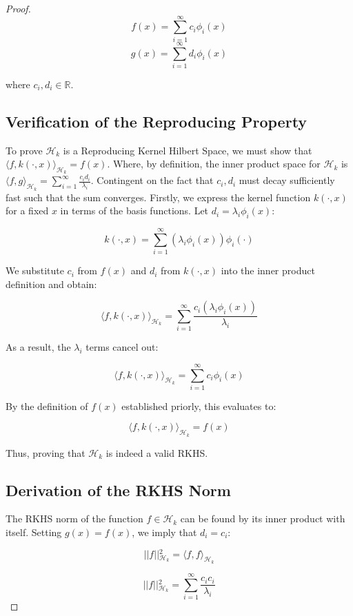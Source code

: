 \documentclass[12pt,oneside]{report}
\theoremstyle{definition}
\theoremstyle{remark}
\begin{document}
\begin{proof}
$$f(x) = \sum_{i=1}^{\infty} c_i \phi_i(x)$$
$$g(x) = \sum_{i=1}^{\infty} d_i \phi_i(x)$$


where $c_i, d_i \in \mathbb{R}$.

\subsection{Verification of the Reproducing Property}
To prove $\mathcal{H}_k$ is a Reproducing Kernel Hilbert Space, we must show that $\langle f, k(\cdot, x) \rangle_{\mathcal{H}_k} = f(x)$. Where, by definition, the inner product space for $\mathcal{H}_k$ is $\langle f, g \rangle_{\mathcal{H}_k} = \sum_{i=1}^{\infty} \frac{c_i d_i}{\lambda_i}$. Contingent on the fact that $c_i, d_i$ must decay sufficiently fast such that the sum converges. Firstly, we express the kernel function $k(\cdot, x)$ for a fixed $x$ in terms of the basis functions. Let $d_i = \lambda_i \phi_i(x)$:


$$k(\cdot, x) = \sum_{i=1}^{\infty} (\lambda_i \phi_i(x)) \phi_i(\cdot)$$

We substitute $c_i$ from $f(x)$ and $d_i$ from $k(\cdot, x)$ into the inner product definition and obtain:

$$\langle f, k(\cdot, x) \rangle_{\mathcal{H}_k} = \sum_{i=1}^{\infty} \frac{c_i (\lambda_i \phi_i(x))}{\lambda_i}$$

As a result, the $\lambda_i$ terms cancel out:

$$\langle f, k(\cdot, x) \rangle_{\mathcal{H}_k} = \sum_{i=1}^{\infty} c_i \phi_i(x)$$

By the definition of $f(x)$ established priorly, this evaluates to:

$$\langle f, k(\cdot, x) \rangle_{\mathcal{H}_k} = f(x)$$

Thus, proving that $\mathcal{H}_k$ is indeed a valid RKHS.

\subsection{Derivation of the RKHS Norm}
The RKHS norm of the function $f \in \mathcal{H}_k$ can be found by its inner product with itself. Setting $g(x) = f(x)$, we imply that $d_i = c_i$:

\begin{equation}
\vert{}\vert{}f\vert{}\vert{}_{\mathcal{H}_k}^2 = \langle f, f \rangle_{\mathcal{H}_k}
\label{eq:rkhs_norm}
\end{equation}

$$\vert{}\vert{}f\vert{}\vert{}_{\mathcal{H}_k}^2 = \sum_{i=1}^{\infty} \frac{c_i c_i}{\lambda_i}$$


\end{proof}
\end{document}

